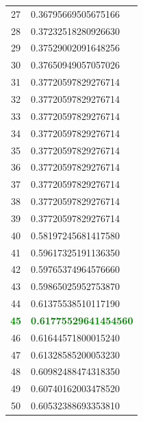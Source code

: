 \begin{table}[H]
\begin{minipage}{.5\linewidth}
\begin{tabular}{@{}cl@{}}
          27 & 0.36795669505675166 \\ 
          28 & 0.37232518280926630 \\
          29 & 0.37529002091648256 \\
          30 & 0.37650949057057026 \\
          31 & 0.37720597829276714 \\
          32 & 0.37720597829276714 \\
          33 & 0.37720597829276714 \\
          34 & 0.37720597829276714 \\
          35 & 0.37720597829276714 \\
          36 & 0.37720597829276714 \\
          37 & 0.37720597829276714 \\
          38 & 0.37720597829276714 \\
          39 & 0.37720597829276714 \\
          40 & 0.58197245681417580 \\
          41 & 0.59617325191136350 \\
          42 & 0.59765374964576660 \\
          43 & 0.59865025952753870 \\
          44 & 0.61375538510117190 \\
          \textcolor{Green}{\textbf{45}} & \textcolor{Green}{\textbf{0.61775529641454560}} \\
          46 & 0.61644571800015240 \\
          47 & 0.61328585200053230 \\
          48 & 0.60982488474318350 \\
          49 & 0.60740162003478520 \\
          50 & 0.60532388693353810 \\ \bottomrule
      \end{tabular}
    \end{minipage}
\end{table}